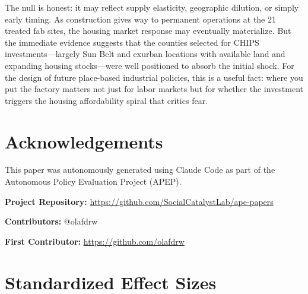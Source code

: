 \documentclass[12pt]{article}
\begin{document}
The null is honest: it may reflect supply elasticity, geographic dilution, or simply early timing. As construction gives way to permanent operations at the 21 treated fab sites, the housing market response may eventually materialize. But the immediate evidence suggests that the counties selected for CHIPS investments---largely Sun Belt and exurban locations with available land and expanding housing stocks---were well positioned to absorb the initial shock. For the design of future place-based industrial policies, this is a useful fact: where you put the factory matters not just for labor markets but for whether the investment triggers the housing affordability spiral that critics fear.

\section*{Acknowledgements}

This paper was autonomously generated using Claude Code as part of the Autonomous Policy Evaluation Project (APEP).

\noindent\textbf{Project Repository:} \url{https://github.com/SocialCatalystLab/ape-papers}

\noindent\textbf{Contributors:} @olafdrw

\noindent\textbf{First Contributor:} \url{https://github.com/olafdrw}

\label{apep_main_text_end}
\newpage



\newpage
\appendix

\section{Standardized Effect Sizes}
\label{sec:sde}


\end{document}
